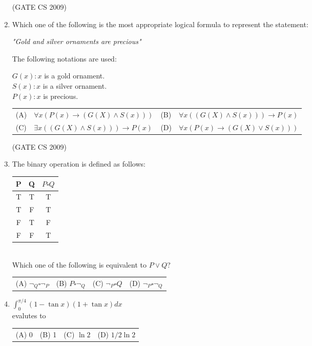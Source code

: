 \documentclass[a4paper, 11pt]{article}
\begin{document}
\begin{enumerate}
    \hfill (GATE CS 2009)

    \item Which one of the following is the most appropriate logical formula to represent the statement:\\
    \begin{center}
        \textit{"Gold and silver ornaments are precious"}\\
    \end{center}
    The following notations are used:\\
        \begin{center}
            $G(x): x$ is a gold ornament.\\
            $S(x): x$ is a silver ornament. \\
            $P(x): x$ is precious.\\
        \end{center}
    \begin{tabularx}{\textwidth}{@{}lX lX@{}}
    (A) & $\forall x(P(x)\rightarrow (G(X)\land S(x)))$   & (B) & $\forall x((G(X)\land S(x)))\rightarrow P(x)$\\
    (C) & $\exists x((G(X)\land S(x)))\rightarrow P(x)$ & (D) & $\forall x(P(x)\rightarrow (G(X)\lor S(x)))$
    \end{tabularx}    

    \hfill (GATE CS 2009)

    \item  The binary operation is defined as follows:\\
    \begin{tabular}{|c|c|c|}
        \hline
        P & Q & $P\square Q$ \\
        \hline
        T & T & T \\
        \hline
        T & F & T \\
        \hline
        F & T & F \\
        \hline
        F & F & T\\
        \hline
    \end{tabular}\\
    Which one of the following is equivalent to $P \lor Q$?\\
    \begin{tabularx}{\textwidth}{@{}XXXX@{}}
    (A) $\neg_ Q \square \neg_ P$ & (B) $ P \square \neg_Q $ & (C) $ \neg_ P \square Q $ & (D) $\neg_ P \square \neg_ Q$
    \end{tabularx}

    \item $\int_0^{\pi/4} (1 - \tan x)(1 + \tan x)dx$\\
    evalutes to\\
    \begin{tabularx}{\textwidth}{@{}XXXX@{}}
    (A) 0 & (B) 1 & (C) $\ln2$ & (D) $1/2\ln2$
    \end{tabularx}


\end{enumerate}
\end{document}

